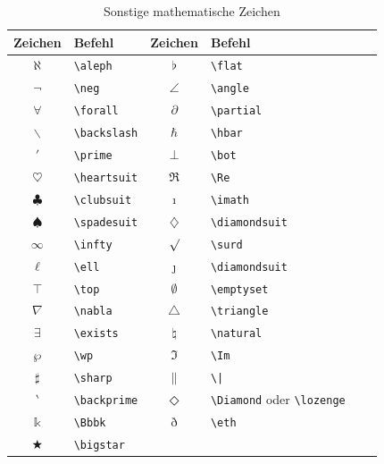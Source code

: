 \documentclass[a4paper,10pt,twoside]{scrbook}
\begin{document}
\begin{table}[h!tb]
\centering
\caption{Sonstige mathematische Zeichen}
\label{Tabelle_Sonstige_Zeichen1}       %
\begin{tabular}{clclcl}
\hline
Zeichen & Befehl & Zeichen & Befehl  \\
\hline
$\aleph$ & \texttt{\textbackslash aleph} & 
$\flat$ & \texttt{\textbackslash flat} \\
$\neg$ & \texttt{\textbackslash neg} &
$\angle$ & \texttt{\textbackslash angle} \\
$\forall$ & \texttt{\textbackslash forall} &
$\partial$ & \texttt{\textbackslash partial}\\
$\backslash$ & \texttt{\textbackslash backslash} & 
$\hbar$ & \texttt{\textbackslash hbar} \\
$\prime$ & \texttt{\textbackslash prime} &
$\bot$ & \texttt{\textbackslash bot} \\
$\heartsuit$ & \texttt{\textbackslash heartsuit} & 
$\Re$ & \texttt{\textbackslash Re}\\
$\clubsuit$ & \texttt{\textbackslash clubsuit} & 
$\imath$ & \texttt{\textbackslash imath} \\
$\spadesuit$ & \texttt{\textbackslash spadesuit} &
$\diamondsuit$ & \texttt{\textbackslash diamondsuit} \\
$\infty$ & \texttt{\textbackslash infty} &
$\surd$ & \texttt{\textbackslash surd}\\
$\ell$ & \texttt{\textbackslash ell} & 
$\jmath$ & \texttt{\textbackslash diamondsuit} \\
$\top$ & \texttt{\textbackslash top} &
$\emptyset$ & \texttt{\textbackslash emptyset} \\
$\nabla$ & \texttt{\textbackslash nabla} &
$\triangle$ & \texttt{\textbackslash triangle}\\
$\exists$ & \texttt{\textbackslash exists} & 
$\natural$ & \texttt{\textbackslash natural} \\
$\wp$ & \texttt{\textbackslash wp} &
$\Im$ & \texttt{\textbackslash Im} \\ 
$\sharp$ & \texttt{\textbackslash sharp}&
$\|$ & \texttt{\textbackslash |}\\
$\backprime$ & \texttt{\textbackslash backprime} & 
$\Diamond$ & \texttt{\textbackslash Diamond} oder \texttt{\textbackslash lozenge} \\
$\Bbbk$ & \texttt{\textbackslash Bbbk} &
$\eth$ & \texttt{\textbackslash eth} \\
$\bigstar$ & \texttt{\textbackslash bigstar} &

\end{tabular}
\end{table}
\end{document}
